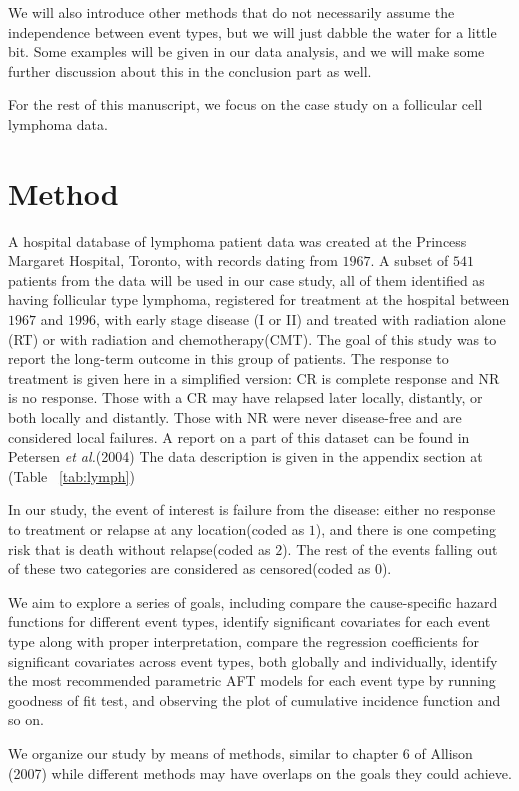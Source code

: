 \documentclass[times, doublespace]{simauth}
\begin{document}
We will also introduce other methods that do not necessarily assume the independence between event types, but we will just dabble the water for a little bit. Some examples will be given in our data analysis, and we will make some further discussion about this in the conclusion part as well.

For the rest of this manuscript, we focus on the case study on a follicular cell lymphoma data.
\section{Method}
A hospital database of lymphoma patient data was created at the Princess Margaret Hospital, Toronto, with records dating from $1967$\cite{pintilie06}. A subset of $541$ patients from the data will be used in our case study, all of them identified as having follicular type lymphoma, registered for treatment at the hospital between $1967$ and $1996$, with early stage disease (I or II) and treated with radiation alone (RT) or with radiation and chemotherapy(CMT). The goal of this study was to report the long-term outcome in this group of patients. The response to treatment is given here in a simplified version: CR is complete response and NR is no response. Those with a CR may have relapsed later locally, distantly, or both locally and distantly. Those with NR were never disease-free and are considered local failures. A report on a part of this dataset can be found in Petersen {\it et al.}(2004)\cite{Peterson04} The data description is given in the appendix section at (Table ~\ref{tab:lymph})

In our study, the event of interest is failure from the disease: either no response to treatment or relapse at any location(coded as $1$), and there is one competing risk that is death without relapse(coded as $2$). The rest of the events falling out of these two categories are considered as censored(coded as $0$).

We aim to explore a series of goals, including compare the cause-specific hazard functions for different event types, identify significant covariates for each event type along with proper interpretation, compare the regression coefficients for significant covariates across event types, both globally and individually, identify the most recommended parametric AFT models for each event type by running goodness of fit test, and observing the plot of cumulative incidence function and so on.

We organize our study by means of methods, similar to chapter 6 of Allison (2007)\cite{Allison10} while different methods may have overlaps on the goals they could achieve.
\end{document}
